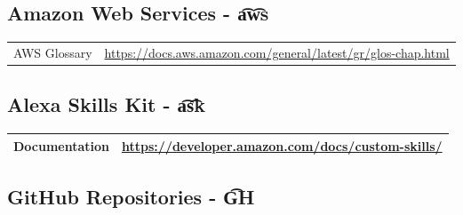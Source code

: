 \subsection*{Amazon Web Services - \t{a\t{ws}}}


\begin{flushleft}
	\begin{tabu} to \textwidth{X |X[2]}




AWS Glossary &
\url{https://docs.aws.amazon.com/general/latest/gr/glos-chap.html}\\

\end{tabu}
\end{flushleft}
	


\subsection*{Alexa Skills Kit - \t{a\t{sk}}}
\begin{flushleft}
	\begin{tabu}to\textwidth{X |  X[2]}

Documentation &
\url{https://developer.amazon.com/docs/custom-skills/} \\


%


\hline


\end{tabu}
\end{flushleft}

\subsection*{GitHub Repositories - \t{GH}}


